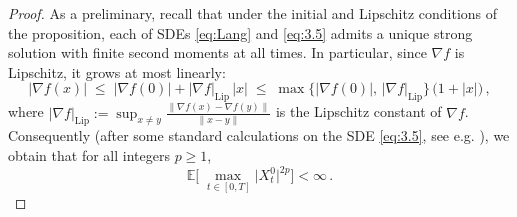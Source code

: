 \documentclass[12pt]{article}
\numberwithin{equation}{section}
\theoremstyle{remark}
\begin{document}
\begin{proof}
As a preliminary, recall that under the initial and Lipschitz conditions of the proposition, each of SDEs \eqref{eq:Lang} and \eqref{eq:3.5} admits a unique strong solution with finite second moments at all times. In particular, since $\nabla f$ is Lipschitz, it grows at most linearly: 
\begin{equation}\label{eq:lipBound}
|\nabla f(x)| \;\le\; |\nabla f(0)| + |\nabla f|_{\text{Lip}}\,|x| \;\le\; \max\{|\nabla f(0)|,\,|\nabla f|_{\text{Lip}}\}\,\big(1 + |x|\big)\,, 
\end{equation} 
where $|\nabla f|_{\text{Lip}} := \sup_{x \neq y}\frac{\|\nabla f(x) - \nabla f(y)\|}{\|x - y\|}$ is the Lipschitz constant of $\nabla f$. Consequently (after some standard calculations on the SDE \eqref{eq:3.5}, see e.g. \cite{ks91}), we obtain that for all integers $p \ge 1$, 
\[ 
\mathbb{E}\!\Big[\,\max_{\,t \in [0,T]} \big|X_t^0\big|^{2p}\Big] < \infty\,.
\tag{3.8}
\] 


\end{proof}
\end{document}
